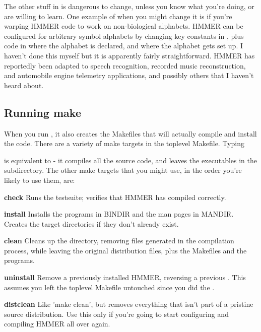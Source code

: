 The other stuff in  is dangerous to change, unless you
know what you're doing, or are willing to learn. One example of when
you might change it is if you're warping HMMER code to work on
non-biological alphabets. HMMER can be configured for arbitrary symbol
alphabets by changing key constants in , plus code in
 where the alphabet is declared, and 
where the alphabet gets set up. I haven't done this myself but it is
apparently fairly straightforward. HMMER has reportedly been adapted
to speech recognition, recorded music reconstruction, and automobile
engine telemetry applications, and possibly others that I haven't
heard about.

\subsection{Running make}

When you run , it also creates the Makefiles that will
actually compile and install the code.  There are a variety of make
targets in the toplevel Makefile. Typing


is equivalent to  - it compiles all the source code,
and leaves the executables in the  subdirectory.  The other
make targets that you might use, in the order you're likely to use
them, are:

\begin{wideitem}
\item[\textbf{check}] Runs the testsuite; verifies that HMMER has
compiled correctly.

\item[\textbf{install}] Installs the programs in BINDIR and
the man pages in MANDIR. Creates the target directories if
they don't already exist.

\item[\textbf{clean}] Cleans up the directory, removing files
generated in the compilation process, while leaving the original
distribution files, plus the Makefiles and the programs.

\item[\textbf{uninstall}] Remove a previously installed HMMER,
reversing a previous . This assumes you left the
toplevel Makefile untouched since you did the .

\item[\textbf{distclean}] Like 'make clean', but removes everything
that isn't part of a pristine source distribution. Use this only if
you're going to start configuring and compiling HMMER all over again.
\end{wideitem}

